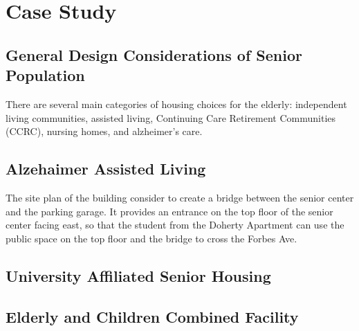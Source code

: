 
\chapter{Case Study} %

\label{Chapter3} %



\section{General Design Considerations of Senior Population}
There are several main categories of housing choices for the elderly:
independent living communities, assisted living, Continuing Care
Retirement Communities (CCRC), nursing homes, and alzheimer's care.

\section{Alzehaimer Assisted Living}
The site plan of the building consider to create a bridge between the senior center and the parking garage. It provides an entrance on the top floor of the senior center facing east, so that the student from the Doherty Apartment can use the public space on the top floor and the bridge to cross the Forbes Ave.\section{University Affiliated Senior Housing}
\section{Elderly and Children Combined Facility}